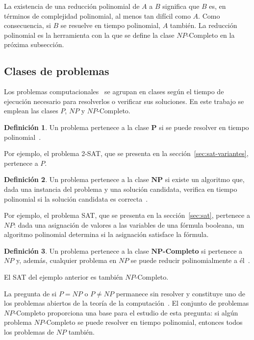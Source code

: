 \documentclass{article}
\theoremstyle{definition}
\newtheorem{definicion}{Definición}
\theoremstyle{plain}
\theoremstyle{remark}
\begin{document}
La existencia de una reducción polinomial de $A$ a $B$ significa que
$B$ es, en términos de complejidad polinomial, al menos tan difícil
como $A$. Como consecuencia, si $B$ se resuelve en tiempo polinomial,
$A$ también. La reducción polinomial es la herramienta con la que se
define la clase $NP$-Completo en la próxima subsección.

\subsection{Clases de problemas}

Los problemas computacionales~\cite{hopcroft2006introduction} se
agrupan en clases según el tiempo de ejecución necesario para
resolverlos o verificar sus soluciones. En este trabajo se emplean las
clases $P$, $NP$ y $NP$-Completo.

\begin{definicion}
  Un problema pertenece a la clase $\boldsymbol{P}$ si se puede resolver
  en tiempo polinomial~\cite{hopcroft2006introduction}.
\end{definicion}

Por ejemplo, el problema 2-SAT, que se presenta en la
sección~\ref{sec:sat-variantes}, pertenece a $P$.

\begin{definicion}
  Un problema pertenece a la clase $\boldsymbol{NP}$ si existe un
  algoritmo que, dada una instancia del problema y una solución
  candidata, verifica en tiempo polinomial si la solución candidata es
  correcta~\cite{hopcroft2006introduction}.
\end{definicion}

Por ejemplo, el problema SAT, que se presenta en la
sección~\ref{sec:sat}, pertenece a $NP$: dada una asignación de
valores a las variables de una fórmula booleana, un algoritmo
polinomial determina si la asignación satisface la fórmula.

\begin{definicion}
  Un problema pertenece a la clase $\boldsymbol{NP}$\textbf{-Completo}
  si pertenece a $NP$ y, además, cualquier problema en $NP$ se puede
  reducir polinomialmente a él~\cite{hopcroft2006introduction}.
\end{definicion}

El SAT del ejemplo anterior es también $NP$-Completo.

La pregunta de si $P = NP$ o $P \neq NP$ permanece sin resolver y
constituye uno de los problemas abiertos  de la teoría de la
computación~\cite{hopcroft2006introduction}. El conjunto de problemas
$NP$-Completo proporciona una base para el estudio de esta pregunta:
si algún problema $NP$-Completo se puede resolver en tiempo
polinomial, entonces todos los problemas de $NP$ también.
\end{document}

